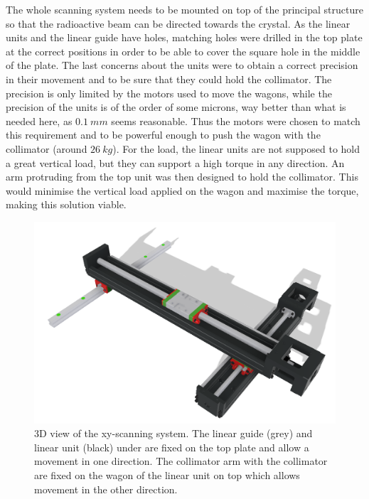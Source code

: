 \documentclass[11pt,a4paper]{article}
\begin{document}
The whole scanning system needs to be mounted on top of the principal structure so that the radioactive beam can be directed towards the crystal. As the linear units and the linear guide have holes, matching holes were drilled in the top plate at the correct positions in order to be able to cover the square hole in the middle of the plate. The last concerns about the units were to obtain a correct precision in their movement and to be sure that they could hold the collimator. The precision is only limited by the motors used to move the wagons, while the precision of the units is of the order of some microns, way better than what is needed here, as $0.1~mm$ seems reasonable. Thus the motors were chosen to match this requirement and to be powerful enough to push the wagon with the collimator (around $26~kg$). For the load, the linear units are not supposed to hold a great vertical load, but they can support a high torque in any direction. An arm protruding from the top unit was then designed to hold the collimator. This would minimise the vertical load applied on the wagon and maximise the torque, making this solution viable.

\begin{figure}[!h]
\centering
\includegraphics[scale=0.4]{position.png}
\caption{3D view of the xy-scanning system. The linear guide (grey) and linear unit (black) under are fixed on the top plate and allow a movement in one direction. The collimator arm with the collimator are fixed on the wagon of the linear unit on top which allows movement in the other direction.}
\label{scan}
\end{figure}
\end{document}
